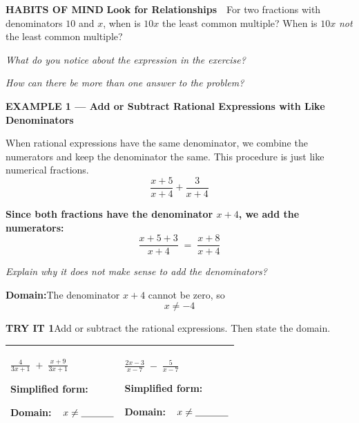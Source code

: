 \documentclass[11pt]{article}
\newcommand{\blank}[1][1.2cm]{\underline{\hspace{#1}}}
\newcommand{\examplehead}[1]{%
  \bigskip\noindent%
  \begin{tcolorbox}[colback=examplebg,colframe=examplebg,boxrule=0pt,
                    left=5pt,right=5pt,top=3pt,bottom=3pt,arc=1pt]%
    \large\bfseries #1%
  \end{tcolorbox}\smallskip}
\newcommand{\sidequestion}[1]{%
  \smallskip\noindent\textit{\small #1}\par}
\begin{document}
\textcolor{accentred}{\textbf{HABITS OF MIND}}\quad
\textbf{Look for Relationships}\ \
For two fractions with denominators $10$ and $x$, when is $10x$ the least
common multiple? When is $10x$ \textit{not} the least common multiple?
\vspace{2cm}

\newpage

\sidequestion{What do you notice about the expression in the exercise?}
\vspace{1.2cm}

\sidequestion{How can there be more than one answer to the problem?}
\vspace{1.2cm}

\examplehead{EXAMPLE 1 --- Add or Subtract Rational Expressions with Like Denominators}

When rational expressions have the same denominator, we combine the numerators
and keep the denominator the same. This procedure is just like numerical
fractions.
\[ \frac{x+5}{x+4} + \frac{3}{x+4} \]

\textbf{Since both fractions have the denominator $x+4$, we add the numerators:}
\[ \frac{x+5+3}{x+4} \;=\; \frac{x+8}{x+4} \]

\sidequestion{Explain why it does not make sense to add the denominators?}
\vspace{1.6cm}

\textbf{Domain:}\quad The denominator $x+4$ cannot be zero, so
\[ x \neq -4 \]

\medskip
\textbf{TRY IT 1}\quad Add or subtract the rational expressions. Then state the domain.

\renewcommand{\arraystretch}{1.3}
\begin{tabularx}{\textwidth}{|>{\raggedright\arraybackslash}X|>{\raggedright\arraybackslash}X|}
\hline
\begin{minipage}[t][5.2cm][t]{\linewidth}
\centering\vspace{0.15cm}
$\displaystyle \frac{4}{3x+1} \;+\; \frac{x+9}{3x+1}$

\vspace{2.2cm}
\raggedright\textbf{Simplified form:}

\vspace{0.9cm}
\textbf{Domain:}\ \ $x \neq \blank[1.2cm]$
\end{minipage}
&
\begin{minipage}[t][5.2cm][t]{\linewidth}
\centering\vspace{0.15cm}
$\displaystyle \frac{2x-3}{x-7} \;-\; \frac{5}{x-7}$

\vspace{2.2cm}
\raggedright\textbf{Simplified form:}

\vspace{0.9cm}
\textbf{Domain:}\ \ $x \neq \blank[1.2cm]$
\end{minipage}
\\ \hline
\end{tabularx}
\renewcommand{\arraystretch}{1.0}
\end{document}
